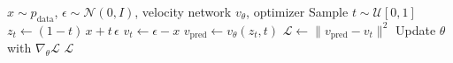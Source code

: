 \begin{algorithm}[htbp]
\caption{Flow Matching Training}
\label{alg:flow_matching}
\begin{algorithmic}[1]
\Require $x \sim p_{\text{data}}$, $\epsilon \sim \mathcal{N}(0,I)$, velocity network $v_\theta$, optimizer
\State Sample $t \sim \mathcal{U}[0,1]$
\State $z_t \gets (1 - t) \, x + t \, \epsilon$
\State $v_t \gets \epsilon - x$ 
\State $v_{\text{pred}} \gets v_\theta(z_t, t)$
\State $\mathcal{L} \gets \| v_{\text{pred}} - v_t \|^2$
\State Update $\theta$ with $\nabla_\theta \mathcal{L}$
\State \Return $\mathcal{L}$
\end{algorithmic}
\end{algorithm}
